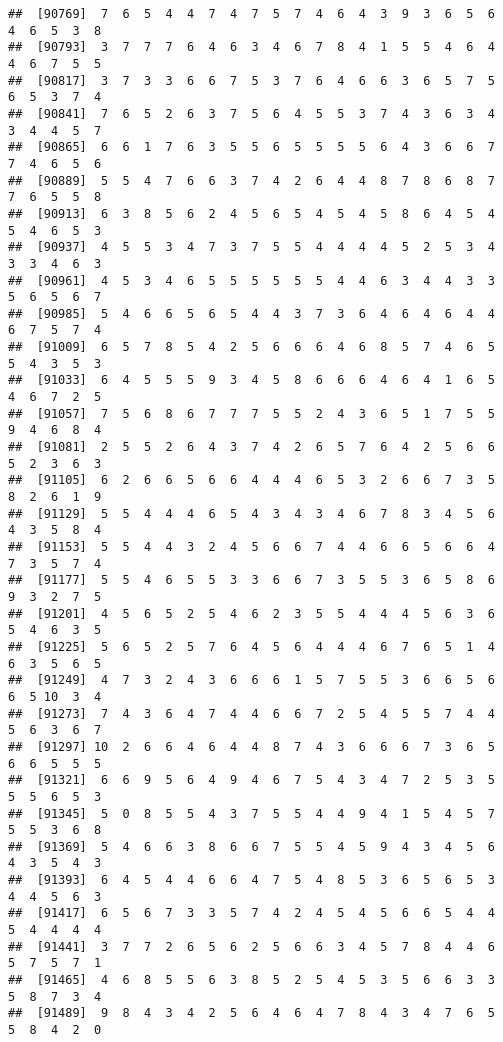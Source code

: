 \documentclass[
]{book}
\begin{document}
\begin{verbatim}
##  [90769]  7  6  5  4  4  7  4  7  5  7  4  6  4  3  9  3  6  5  6  4  6  5  3  8
##  [90793]  3  7  7  7  6  4  6  3  4  6  7  8  4  1  5  5  4  6  4  4  6  7  5  5
##  [90817]  3  7  3  3  6  6  7  5  3  7  6  4  6  6  3  6  5  7  5  6  5  3  7  4
##  [90841]  7  6  5  2  6  3  7  5  6  4  5  5  3  7  4  3  6  3  4  3  4  4  5  7
##  [90865]  6  6  1  7  6  3  5  5  6  5  5  5  5  6  4  3  6  6  7  7  4  6  5  6
##  [90889]  5  5  4  7  6  6  3  7  4  2  6  4  4  8  7  8  6  8  7  7  6  5  5  8
##  [90913]  6  3  8  5  6  2  4  5  6  5  4  5  4  5  8  6  4  5  4  5  4  6  5  3
##  [90937]  4  5  5  3  4  7  3  7  5  5  4  4  4  4  5  2  5  3  4  3  3  4  6  3
##  [90961]  4  5  3  4  6  5  5  5  5  5  5  4  4  6  3  4  4  3  3  5  6  5  6  7
##  [90985]  5  4  6  6  5  6  5  4  4  3  7  3  6  4  6  4  6  4  4  6  7  5  7  4
##  [91009]  6  5  7  8  5  4  2  5  6  6  6  4  6  8  5  7  4  6  5  5  4  3  5  3
##  [91033]  6  4  5  5  5  9  3  4  5  8  6  6  6  4  6  4  1  6  5  4  6  7  2  5
##  [91057]  7  5  6  8  6  7  7  7  5  5  2  4  3  6  5  1  7  5  5  9  4  6  8  4
##  [91081]  2  5  5  2  6  4  3  7  4  2  6  5  7  6  4  2  5  6  6  5  2  3  6  3
##  [91105]  6  2  6  6  5  6  6  4  4  4  6  5  3  2  6  6  7  3  5  8  2  6  1  9
##  [91129]  5  5  4  4  4  6  5  4  3  4  3  4  6  7  8  3  4  5  6  4  3  5  8  4
##  [91153]  5  5  4  4  3  2  4  5  6  6  7  4  4  6  6  5  6  6  4  7  3  5  7  4
##  [91177]  5  5  4  6  5  5  3  3  6  6  7  3  5  5  3  6  5  8  6  9  3  2  7  5
##  [91201]  4  5  6  5  2  5  4  6  2  3  5  5  4  4  4  5  6  3  6  5  4  6  3  5
##  [91225]  5  6  5  2  5  7  6  4  5  6  4  4  4  6  7  6  5  1  4  6  3  5  6  5
##  [91249]  4  7  3  2  4  3  6  6  6  1  5  7  5  5  3  6  6  5  6  6  5 10  3  4
##  [91273]  7  4  3  6  4  7  4  4  6  6  7  2  5  4  5  5  7  4  4  5  6  3  6  7
##  [91297] 10  2  6  6  4  6  4  4  8  7  4  3  6  6  6  7  3  6  5  6  6  5  5  5
##  [91321]  6  6  9  5  6  4  9  4  6  7  5  4  3  4  7  2  5  3  5  5  5  6  5  3
##  [91345]  5  0  8  5  5  4  3  7  5  5  4  4  9  4  1  5  4  5  7  5  5  3  6  8
##  [91369]  5  4  6  6  3  8  6  6  7  5  5  4  5  9  4  3  4  5  6  4  3  5  4  3
##  [91393]  6  4  5  4  4  6  6  4  7  5  4  8  5  3  6  5  6  5  3  4  4  5  6  3
##  [91417]  6  5  6  7  3  3  5  7  4  2  4  5  4  5  6  6  5  4  4  5  4  4  4  4
##  [91441]  3  7  7  2  6  5  6  2  5  6  6  3  4  5  7  8  4  4  6  5  7  5  7  1
##  [91465]  4  6  8  5  5  6  3  8  5  2  5  4  5  3  5  6  6  3  3  5  8  7  3  4
##  [91489]  9  8  4  3  4  2  5  6  4  6  4  7  8  4  3  4  7  6  5  5  8  4  2  0

\end{verbatim}
\end{document}
